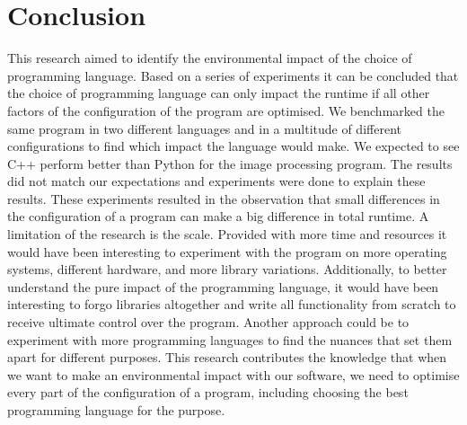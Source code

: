 \chapter{Conclusion}
This research aimed to identify the environmental impact of the choice of programming language. Based on a series of experiments it can be concluded that the choice of programming language can only impact the runtime if all other factors of the configuration of the program are optimised.
We benchmarked the same program in two different languages and in a multitude of different configurations to find which impact the language would make. We expected to see C++ perform better than Python for the image processing program. The results did not match our expectations and experiments were done to explain these results. These experiments resulted in the observation that small differences in the configuration of a program can make a big difference in total runtime.
A limitation of the research is the scale. Provided with more time and resources it would have been interesting to experiment with the program on more operating systems, different hardware, and more library variations. Additionally, to better understand the pure impact of the programming language, it would have been interesting to forgo libraries altogether and write all functionality from scratch to receive ultimate control over the program. Another approach could be to experiment with more programming languages to find the nuances that set them apart for different purposes.
This research contributes the knowledge that when we want to make an environmental impact with our software, we need to optimise every part of the configuration of a program, including choosing the best programming language for the purpose.
